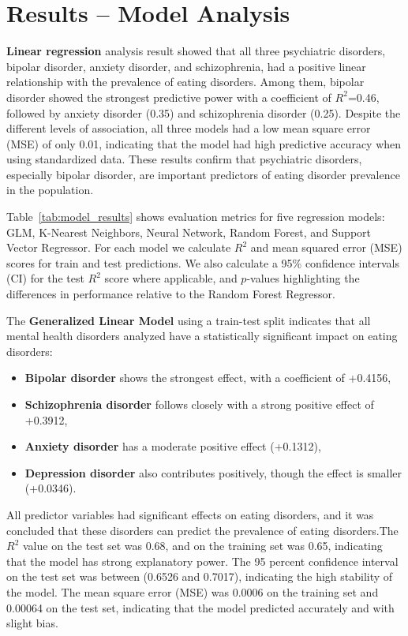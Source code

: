 \section{Results – Model Analysis}
\label{sec:results}

\textbf{Linear regression} analysis result showed that all three psychiatric disorders, bipolar disorder, anxiety disorder, and schizophrenia, had a positive linear relationship with the prevalence of eating disorders. Among them, bipolar disorder showed the strongest predictive power with a coefficient of $R^2$=0.46, followed by anxiety disorder (0.35) and schizophrenia disorder (0.25). Despite the different levels of association, all three models had a low mean square error (MSE) of only 0.01, indicating that the model had high predictive accuracy when using standardized data. These results confirm that psychiatric disorders, especially bipolar disorder, are important predictors of eating disorder prevalence in the population.

Table~\ref{tab:model_results} shows evaluation metrics for five regression models: GLM, K-Nearest Neighbors, Neural Network, Random Forest, and Support Vector Regressor. For each model we calculate $R^2$ and mean squared error (MSE) scores for train and test predictions. We also calculate a 95\% confidence intervals (CI) for the test $R^2$ score where applicable, and $p$-values highlighting the differences in performance relative to the Random Forest Regressor.

The \textbf{Generalized Linear Model} using a train-test split indicates that all mental health disorders analyzed have a statistically significant impact on eating disorders:
\begin{itemize}
    \item \textbf{Bipolar disorder} shows the strongest effect, with a coefficient of +0.4156,
    \item \textbf{Schizophrenia disorder} follows closely with a strong positive effect of +0.3912,
    \item \textbf{Anxiety disorder} has a moderate positive effect (+0.1312),
    \item \textbf{Depression disorder} also contributes positively, though the effect is smaller (+0.0346).
\end{itemize}
All predictor variables had significant effects on eating disorders, and it was concluded that these disorders can predict the prevalence of eating disorders.The $R^2$ value on the test set was 0.68, and on the training set was 0.65, indicating that the model has strong explanatory power. The 95 percent confidence interval on the test set was between (0.6526 and 0.7017), indicating the high stability of the model. The mean square error (MSE) was 0.0006 on the training set and 0.00064 on the test set, indicating that the model predicted accurately and with slight bias.

